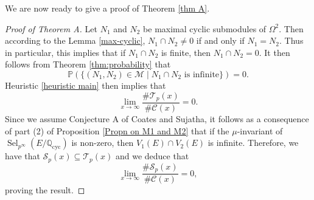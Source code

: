 \documentclass[12pt]{amsart}
\newcommand{\Q}{\mathbb{Q}}
\newcommand{\op}[1]{\operatorname{#1}}
\numberwithin{equation}{section}
\begin{document}
We are now ready to give a proof of Theorem \ref{thm A}.
\begin{proof}[Proof of Theorem A]
    Let $N_1$ and $N_2$ be maximal cyclic submodules of $\Omega^2$. Then according to the Lemma \ref{max-cyclic}, $N_1\cap N_2\neq 0$ if and only if $N_1=N_2$. Thus in particular, this implies that if $N_1 \cap N_2$ is finite, then $N_1\cap N_2=0$. It then follows from Theorem \ref{thm:probability} that \[\mathbb{P}\left(\{(N_1, N_2)\in \mathcal{M}\mid N_1\cap N_2\text{ is infinite}\}\right)=0.\]
    Heuristic \ref{heuristic main} then implies that  \[\lim_{x\rightarrow\infty} \frac{\# \mathcal{T}_p(x)}{\# \mathcal{C}(x)}=0.\] Since we assume Conjecture A of Coates and Sujatha, it follows as a consequence of part (2) of Proposition \ref{Propn on M1 and M2} that if the $\mu$-invariant of $\op{Sel}_{p^\infty}(E/\Q_{\op{cyc}})$ is non-zero, then $V_1(E)\cap V_2(E)$ is infinite. Therefore, we have that $\mathcal{S}_p(x)\subseteq \mathcal{T}_p(x)$ and we deduce that  \[\lim_{x\rightarrow\infty} \frac{\# \mathcal{S}_p(x)}{\# \mathcal{C}(x)}=0,\] proving the result. 
\end{proof}





\end{document}
